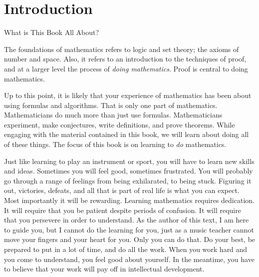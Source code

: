 \chapter{Introduction}\label{chap:intro}


\begin{section}{What is This Book All About?}%

The foundations of mathematics refers to logic and set theory; the axioms of number and space.  Also, it refers to an introduction to the techniques of proof, and at a larger level the process of \emph{doing mathematics}.  Proof is central to doing mathematics.

Up to this point, it is likely that your experience of mathematics has been about using formulas and algorithms. That is only one part of mathematics. Mathematicians do much more than just use formulas.  Mathematicians experiment, make conjectures, write definitions, and prove theorems.  While engaging with the material contained in this book, we will learn about doing all of these things. The focus of this book is on learning to \emph{do} mathematics. 

Just like learning to play an instrument or sport, you will have to learn new skills and ideas.  Sometimes you will feel good, sometimes frustrated.  You will probably go through a range of feelings from being exhilarated, to being stuck.  Figuring it out, victories, defeats, and all that is part of real life is what you can expect.  Most importantly it will be rewarding.  Learning mathematics requires dedication.  It will require that you be patient despite periods of confusion.  It will require that you persevere in order to understand.  As the author of this text, I am here to guide you, but I cannot do the learning for you, just as a music teacher cannot move your fingers and your heart for you.  Only you can do that.  
Do your best, be prepared to put in a lot of time, and do all the work. 
When you work hard and you come to understand, you feel good about yourself.  In the meantime, you have to believe that your work will pay off in intellectual development.


\end{section}
